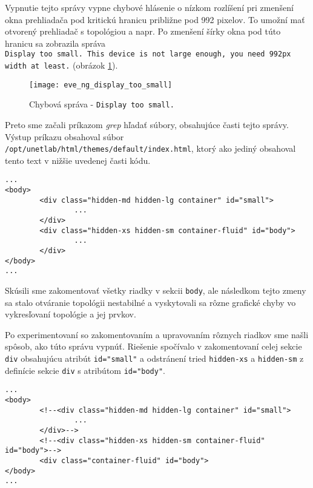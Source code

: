 Vypnutie tejto správy vypne chybové hlásenie o nízkom rozlíšení pri zmenšení okna prehliadača pod kritickú hranicu približne pod 992 pixelov. To umožní mať otvorený prehliadač s topológiou a napr.  Po zmenšení šírky okna pod túto hranicu sa zobrazila správa \\
\texttt{Display too small. This device is not large enough, you need 992px width at least.} (obrázok \ref{obr:eve_ng_display_too_small}).

\begin{figure}
    \centering
    \texttt{[image: eve\_ng\_display\_too\_small]}
    \caption{Chybová správa - \texttt{Display too small.}}
    \label{obr:eve_ng_display_too_small}
\end{figure}

Preto sme začali príkazom \emph{grep} hľadať súbory, obsahujúce časti tejto správy. Výstup príkazu obsahoval súbor  \texttt{/opt/unetlab/html/themes/default/index.html}, ktorý ako jediný obsahoval tento text v nižšie uvedenej časti kódu.

\renewcommand\baselinestretch{1}
\begin{Verbatim}[samepage=true]
...
<body>
        <div class="hidden-md hidden-lg container" id="small">
                ...
        </div>
        <div class="hidden-xs hidden-sm container-fluid" id="body">
                ...
        </div>
</body>
...
\end{Verbatim}
\renewcommand\baselinestretch{1.5}

Skúsili sme zakomentovať všetky riadky v sekcii \texttt{body}, ale následkom tejto zmeny sa stalo otváranie topológii nestabilné a vyskytovali sa rôzne grafické chyby vo vykresľovaní topológie a jej prvkov.

Po experimentovaní so zakomentovaním a upravovaním rôznych riadkov sme našli spôsob, ako túto správu vypnúť. Riešenie spočívalo v zakomentovaní celej sekcie \texttt{div} obsahujúcu atribút \texttt{id="small"} a odstránení tried \texttt{hidden-xs} a \texttt{hidden-sm} z definície sekcie \texttt{div} s atribútom \texttt{id="body"}.

\renewcommand\baselinestretch{1}
\begin{Verbatim}[samepage=true]
...
<body>
        <!--<div class="hidden-md hidden-lg container" id="small">
                ...
        </div>-->
        <!--<div class="hidden-xs hidden-sm container-fluid" id="body">-->
        <div class="container-fluid" id="body">
</body>
...
\end{Verbatim}
\renewcommand\baselinestretch{1.5}

